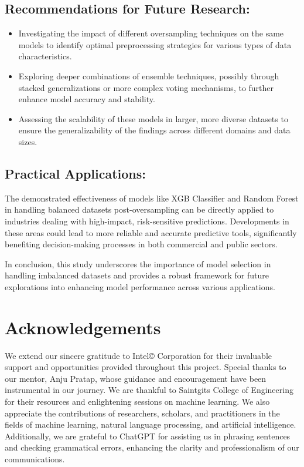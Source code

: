 \documentclass[a4paper,num-refs,gigabyte]{oup-contemporary}
\begin{document}
\subsection*{Recommendations for Future Research:}
\begin{itemize}
    \item Investigating the impact of different oversampling techniques on the same models to identify optimal preprocessing strategies for various types of data characteristics.
    \item Exploring deeper combinations of ensemble techniques, possibly through stacked generalizations or more complex voting mechanisms, to further enhance model accuracy and stability.
    \item Assessing the scalability of these models in larger, more diverse datasets to ensure the generalizability of the findings across different domains and data sizes.
\end{itemize}

\subsection*{Practical Applications:}
The demonstrated effectiveness of models like XGB Classifier and Random Forest in handling balanced datasets post-oversampling can be directly applied to industries dealing with high-impact, risk-sensitive predictions.
Developments in these areas could lead to more reliable and accurate predictive tools, significantly benefiting decision-making processes in both commercial and public sectors.

In conclusion, this study underscores the importance of model selection in handling imbalanced datasets and provides a robust framework for future explorations into enhancing model performance across various applications.






\section{Acknowledgements}

We extend our sincere gratitude to Intel© Corporation for their invaluable support and opportunities provided throughout this project. Special thanks to our mentor, Anju Pratap, whose guidance and encouragement have been instrumental in our journey. We are thankful to Saintgits College of Engineering for their resources and enlightening sessions on machine learning. We also appreciate the contributions of researchers, scholars, and practitioners in the fields of machine learning, natural language processing, and artificial intelligence. Additionally, we are grateful to ChatGPT for assisting us in phrasing sentences and checking grammatical errors, enhancing the clarity and professionalism of our communications.
\end{document}
